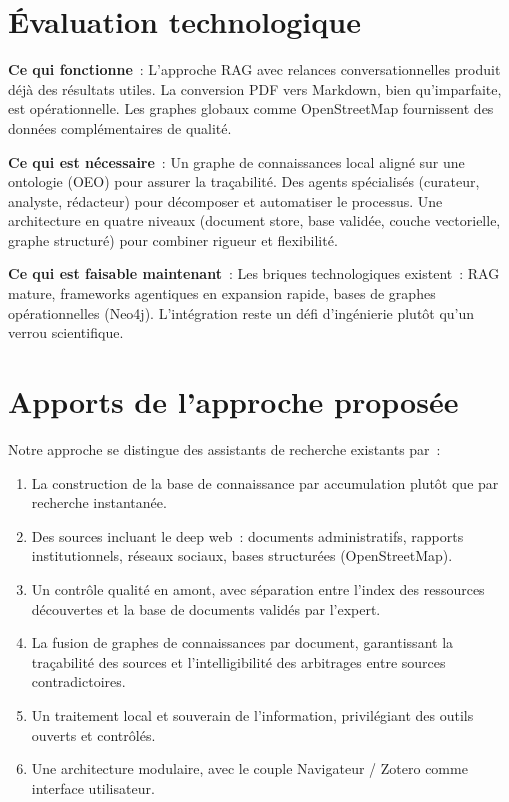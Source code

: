 \documentclass[a4paper,11pt]{report}
\begin{document}
\section{Évaluation technologique}

\textbf{Ce qui fonctionne}~: L'approche RAG avec relances conversationnelles produit déjà des résultats utiles. La conversion PDF vers Markdown, bien qu'imparfaite, est opérationnelle. Les graphes globaux comme OpenStreetMap fournissent des données complémentaires de qualité.

\textbf{Ce qui est nécessaire}~: Un graphe de connaissances local aligné sur une ontologie (OEO) pour assurer la traçabilité. Des agents spécialisés (curateur, analyste, rédacteur) pour décomposer et automatiser le processus. Une architecture en quatre niveaux (document store, base validée, couche vectorielle, graphe structuré) pour combiner rigueur et flexibilité.

\textbf{Ce qui est faisable maintenant}~: Les briques technologiques existent~: RAG mature, frameworks agentiques en expansion rapide, bases de graphes opérationnelles (Neo4j). L'intégration reste un défi d'ingénierie plutôt qu'un verrou scientifique.

\section{Apports de l'approche proposée}

Notre approche se distingue des assistants de recherche existants par~:

\begin{enumerate}
\item La construction de la base de connaissance par accumulation plutôt que par recherche instantanée.
\item Des sources incluant le deep web~: documents administratifs, rapports institutionnels, réseaux sociaux, bases structurées (OpenStreetMap).
\item Un contrôle qualité en amont, avec séparation entre l'index des ressources découvertes et la base de documents validés par l'expert.
\item La fusion de graphes de connaissances par document, garantissant la traçabilité des sources et l'intelligibilité des arbitrages entre sources contradictoires.
\item Un traitement local et souverain de l'information, privilégiant des outils ouverts et contrôlés.
\item Une architecture modulaire, avec le couple Navigateur / Zotero comme interface utilisateur.
\end{enumerate}
\end{document}

